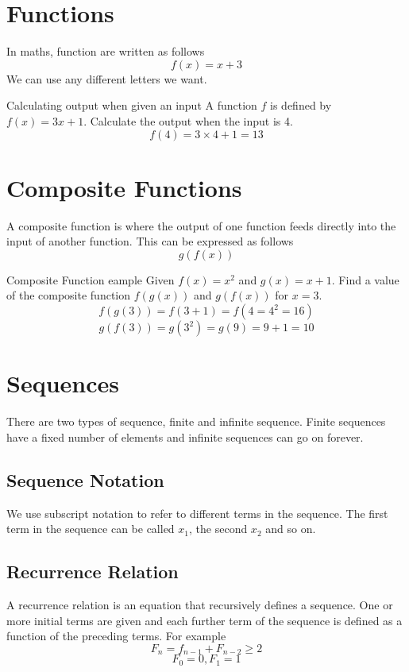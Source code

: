
\section*{Functions}
In maths, function are written as follows
\[f(x) = x + 3\]
We can use any different letters we want.
\begin{example}{Calculating output when given an input}
A function $f$ is defined by $f(x) = 3x+1$. Calculate the output when the input is 4.
\[f(4) = 3\times 4 + 1 = 13\]
\end{example}

\section*{Composite Functions}
A composite function is where the output of one function feeds directly into the input of another function. This can be expressed as follows
\[g(f(x))\]
\begin{example}{Composite Function eample}
Given $f(x) = x^2$ and $g(x) = x+1$. Find a value of the composite function $f(g(x))$ and $g(f(x))$ for $x=3$.
\[f(g(3)) = f(3+1) = f(4 = 4^2 = 16)\]
\[g(f(3)) = g(3^2) = g(9) = 9+1 = 10\]
\end{example}

\section*{Sequences}

There are two types of sequence, finite and infinite sequence. Finite sequences have a fixed number of elements and infinite sequences can go on forever. 
\subsection*{Sequence Notation}
We use subscript notation to refer to different terms in the sequence. The first term in the sequence can be called $x_1$, the second $x_2$ and so on. 

\subsection*{Recurrence Relation}
A recurrence relation is an equation that recursively defines a sequence. One or more initial terms are given and each further term of the sequence is defined as a function of the preceding terms. For example
\[F_n = f_{n-1} + F_{n-2}\geq 2\]
\[F_0 = 0, F_1 = 1\]